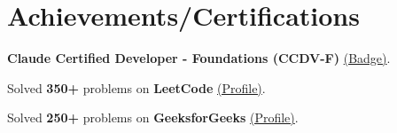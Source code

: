 \section{Achievements/Certifications}
\small{
    \resumeItemListStart
        \item {\textbf{Claude Certified Developer - Foundations (CCDV-F)} \href{https://www.credly.com/badges/616e0bec-de91-43ee-a1f7-69fe265bc080/public_url}{(Badge)}.}
        \item {Solved \textbf{350+} problems on \textbf{LeetCode} \href{https://leetcode.com/u/soham8282/}{(Profile)}.}
        \item {Solved \textbf{250+} problems on \textbf{GeeksforGeeks} \href{https://www.geeksforgeeks.org/user/soham42/}{(Profile)}.}
    \resumeItemListEnd
}
